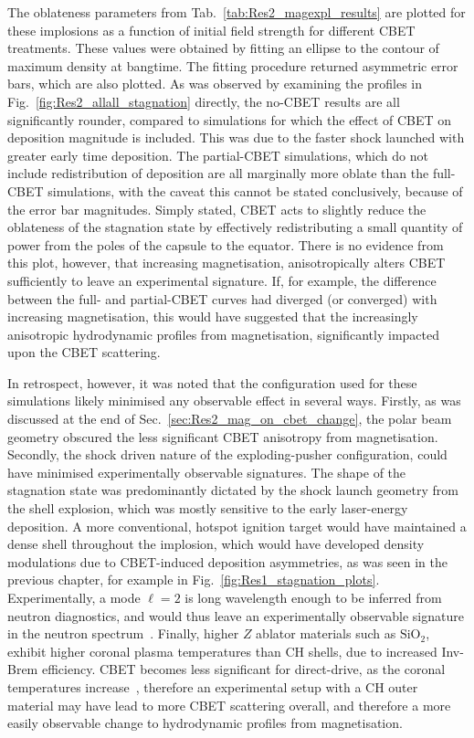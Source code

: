 The oblateness parameters from Tab.~\ref{tab:Res2_magexpl_results} are plotted for these implosions as a function of initial field strength for different \ac{CBET} treatments.
These values were obtained by fitting an ellipse to the contour of maximum density at bangtime.
The fitting procedure returned asymmetric error bars, which are also plotted.
As was observed by examining the profiles in Fig.~\ref{fig:Res2_allall_stagnation} directly, the no-\ac{CBET} results are all significantly rounder, compared to simulations for which the effect of \ac{CBET} on deposition magnitude is included.
This was due to the faster shock launched with greater early time deposition.
The partial-\ac{CBET} simulations, which do not include redistribution of deposition are all marginally more oblate than the full-\ac{CBET} simulations, with the caveat this cannot be stated conclusively, because of the error bar magnitudes.
Simply stated, \ac{CBET} acts to slightly reduce the oblateness of the stagnation state by effectively redistributing a small quantity of power from the poles of the capsule to the equator.
There is no evidence from this plot, however, that increasing magnetisation, anisotropically alters \ac{CBET} sufficiently to leave an experimental signature.
If, for example, the difference between the full- and partial-\ac{CBET} curves had diverged (or converged) with increasing magnetisation, this would have suggested that the increasingly anisotropic hydrodynamic profiles from magnetisation, significantly impacted upon the \ac{CBET} scattering.

In retrospect, however, it was noted that the configuration used for these simulations likely minimised any observable effect in several ways.
Firstly, as was discussed at the end of Sec.~\ref{sec:Res2_mag_on_cbet_change}, the polar beam geometry obscured the less significant \ac{CBET} anisotropy from magnetisation.
Secondly, the shock driven nature of the exploding-pusher configuration, could have minimised experimentally observable signatures.
The shape of the stagnation state was predominantly dictated by the shock launch geometry from the shell explosion, which was mostly sensitive to the early laser-energy deposition.
A more conventional, hotspot ignition target would have maintained a dense shell throughout the implosion, which would have developed density modulations due to \ac{CBET}-induced deposition asymmetries, as was seen in the previous chapter, for example in Fig.~\ref{fig:Res1_stagnation_plots}.
Experimentally, a mode $\ell=2$ is long wavelength enough to be inferred from neutron diagnostics, and would thus leave an experimentally observable signature in the neutron spectrum~\cite{woo_impact_2018,casey_three_2021}.
Finally, higher $Z$ ablator materials such as $\text{SiO}_2$, exhibit higher coronal plasma temperatures than CH shells, due to increased \ac{Inv-Brem} efficiency.
\ac{CBET} becomes less significant for direct-drive, as the coronal temperatures increase~\cite{colaitis_exploration_2023}, therefore an experimental setup with a CH outer material may have lead to more \ac{CBET} scattering overall, and therefore a more easily observable change to hydrodynamic profiles from magnetisation.

